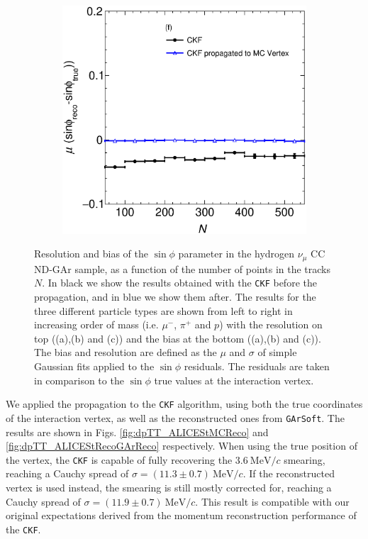 \begin{figure}[t]
\begin{subfigure}{0.32\textwidth}
         \caption{} \label{fig:BiassinphiVSNPoints_VertexComparison_211}
     \end{subfigure}
          \begin{subfigure}{0.32\textwidth}
         \centering
        \includegraphics[width=\textwidth]{figures/ch6-TKI/sinphiRes/BiassinphiVSNPoints_VertexComparison_2212.eps}
         \caption{} \label{fig:BiassinphiVSNPoints_VertexComparison_2212}
     \end{subfigure}
        \caption{Resolution and bias of the $\sin\phi$ parameter in the hydrogen $\nu_\mu$ CC ND-GAr sample, as a function of the number of points in the tracks $N$. In black we show the results obtained with the \texttt{CKF} before the propagation, and in blue we show them after. The results for the three different particle types are shown from left to right in increasing order of mass (i.e. $\mu^-$, $\pi^+$ and $p$) with the resolution on top ((a),(b) and (c)) and the bias at the bottom ((a),(b) and (c)).  The bias and resolution are defined as the $\mu$ and $\sigma$ of simple Gaussian fits applied to the $\sin\phi$ residuals. The residuals are taken in comparison to the $\sin\phi$ true values at the interaction vertex.}
        \label{fig:sinphiRes2DNPoints_Vertex}
\end{figure}


We applied the propagation to the \texttt{CKF} algorithm, using both the true coordinates of the interaction vertex, as well as the reconstructed ones from \texttt{GArSoft}. The results are shown in Figs. \ref{fig:dpTT_ALICEStMCReco} and \ref{fig:dpTT_ALICEStRecoGArReco} respectively. When using the true position of the vertex, the \texttt{CKF} is capable of fully recovering the $3.6 \ \text{MeV}/c$ smearing, reaching a Cauchy spread of $\sigma= (11.3\pm0.7) \ \text{MeV}/c$. If the reconstructed vertex is used instead, the smearing is still mostly corrected for, reaching a Cauchy spread of $\sigma= (11.9\pm0.7) \ \text{MeV}/c$. This result is compatible with our original expectations derived from the momentum reconstruction performance of the \texttt{CKF}.

